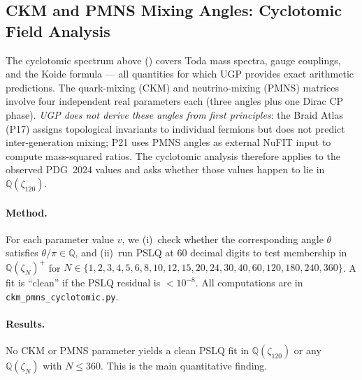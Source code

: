 
\subsection{CKM and PMNS Mixing Angles: Cyclotomic Field Analysis}
\label{sec:ckm_pmns_cyclotomic}

The cyclotomic spectrum above () covers
Toda mass spectra, gauge couplings, and the Koide formula — all
quantities for which UGP provides exact arithmetic predictions.
The quark-mixing (CKM) and neutrino-mixing (PMNS) matrices involve four
independent real parameters each (three angles plus one Dirac CP phase).
\emph{UGP does not derive these angles from first principles}: the
Braid Atlas (P17) assigns topological invariants to individual fermions
but does not predict inter-generation mixing; P21 uses PMNS angles as
external NuFIT input to compute mass-squared ratios.  The cyclotomic
analysis therefore applies to the observed PDG~2024 values and asks
whether those values happen to lie in $\mathbb{Q}(\zeta_{120})$.

\paragraph{Method.}
For each parameter value $v$, we (i)~check whether the corresponding angle
$\theta$ satisfies $\theta/\pi \in \mathbb{Q}$, and (ii)~run PSLQ at 60
decimal digits to test membership in $\mathbb{Q}(\zeta_N)^+$ for
$N \in \{1,2,3,4,5,6,8,10,12,15,20,24,30,40,60,120,180,240,360\}$.
A fit is ``clean'' if the PSLQ residual is $< 10^{-8}$.  All computations
are in \texttt{ckm\_pmns\_cyclotomic.py}.

\paragraph{Results.}
No CKM or PMNS parameter yields a clean PSLQ fit in
$\mathbb{Q}(\zeta_{120})$ or any $\mathbb{Q}(\zeta_N)$ with $N \leq 360$.
This is the main quantitative finding.

